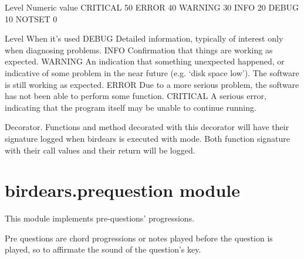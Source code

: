 \documentclass[letterpaper,10pt,english]{sphinxmanual}
\begin{document}
%
\begin{sphinxVerbatim}[commandchars=\\\{\}]
Level       Numeric value
\PYGZhy{}\PYGZhy{}\PYGZhy{}\PYGZhy{}\PYGZhy{}       \PYGZhy{}\PYGZhy{}\PYGZhy{}\PYGZhy{}\PYGZhy{}\PYGZhy{}\PYGZhy{}\PYGZhy{}\PYGZhy{}\PYGZhy{}\PYGZhy{}\PYGZhy{}\PYGZhy{}
CRITICAL    50
ERROR       40
WARNING     30
INFO        20
DEBUG       10
NOTSET      0

Level       When it’s used
\PYGZhy{}\PYGZhy{}\PYGZhy{}\PYGZhy{}\PYGZhy{}       \PYGZhy{}\PYGZhy{}\PYGZhy{}\PYGZhy{}\PYGZhy{}\PYGZhy{}\PYGZhy{}\PYGZhy{}\PYGZhy{}\PYGZhy{}\PYGZhy{}\PYGZhy{}\PYGZhy{}\PYGZhy{}
DEBUG       Detailed information, typically of interest only when
                diagnosing problems.
INFO        Confirmation that things are working as expected.
WARNING     An indication that something unexpected happened, or indicative
                of some problem in the near future (e.g. ‘disk space low’).
                The software is still working as expected.
ERROR       Due to a more serious problem, the software has not been able
                to perform some function.
CRITICAL    A serious error, indicating that the program itself may be
                unable to continue running.
\end{sphinxVerbatim}

\begin{fulllineitems}
\label{\detokenize{birdears:birdears.logger.log_event}}
Decorator. Functions and method decorated with this decorator will have
their signature logged when birdears is executed with  mode. Both
function signature with their call values and their return will be logged.

\end{fulllineitems}



\section{birdears.prequestion module}
\label{\detokenize{birdears:module-birdears.prequestion}}\label{\detokenize{birdears:birdears-prequestion-module}}
This module implements pre-questions’ progressions.

Pre questions are chord progressions or notes played before the question is
played, so to affirmate the sound of the question’s key.
\end{document}
